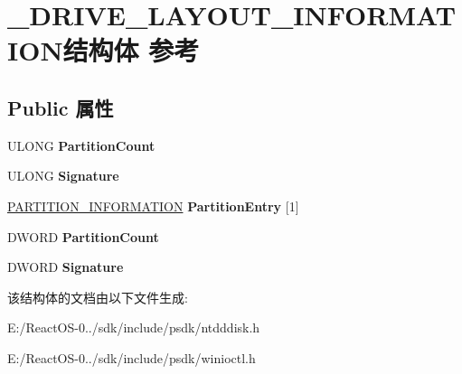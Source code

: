 \hypertarget{struct___d_r_i_v_e___l_a_y_o_u_t___i_n_f_o_r_m_a_t_i_o_n}{}\section{\+\_\+\+D\+R\+I\+V\+E\+\_\+\+L\+A\+Y\+O\+U\+T\+\_\+\+I\+N\+F\+O\+R\+M\+A\+T\+I\+O\+N结构体 参考}
\label{struct___d_r_i_v_e___l_a_y_o_u_t___i_n_f_o_r_m_a_t_i_o_n}
\subsection*{Public 属性}
\begin{DoxyCompactItemize}
\item 
\mbox{\label{struct___d_r_i_v_e___l_a_y_o_u_t___i_n_f_o_r_m_a_t_i_o_n_a4912d7e761039f013b5214fc416796d9}} 
U\+L\+O\+NG {\bfseries Partition\+Count}
\item 
\mbox{\label{struct___d_r_i_v_e___l_a_y_o_u_t___i_n_f_o_r_m_a_t_i_o_n_ae504069eb003827d81233767945b92eb}} 
U\+L\+O\+NG {\bfseries Signature}
\item 
\mbox{\label{struct___d_r_i_v_e___l_a_y_o_u_t___i_n_f_o_r_m_a_t_i_o_n_a8dd4712284582f0832d22f612792baa5}} 
\hyperlink{struct___p_a_r_t_i_t_i_o_n___i_n_f_o_r_m_a_t_i_o_n}{P\+A\+R\+T\+I\+T\+I\+O\+N\+\_\+\+I\+N\+F\+O\+R\+M\+A\+T\+I\+ON} {\bfseries Partition\+Entry} \mbox{[}1\mbox{]}
\item 
\mbox{\label{struct___d_r_i_v_e___l_a_y_o_u_t___i_n_f_o_r_m_a_t_i_o_n_a4912d7e761039f013b5214fc416796d9}} 
D\+W\+O\+RD {\bfseries Partition\+Count}
\item 
\mbox{\label{struct___d_r_i_v_e___l_a_y_o_u_t___i_n_f_o_r_m_a_t_i_o_n_ae504069eb003827d81233767945b92eb}} 
D\+W\+O\+RD {\bfseries Signature}
\end{DoxyCompactItemize}


该结构体的文档由以下文件生成\+:\begin{DoxyCompactItemize}
\item 
E\+:/\+React\+O\+S-\/0../sdk/include/psdk/ntdddisk.\+h\item 
E\+:/\+React\+O\+S-\/0../sdk/include/psdk/winioctl.\+h\end{DoxyCompactItemize}
